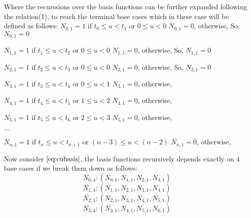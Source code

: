 \documentclass{article}
\begin{document}
Where the recurssions over the basis functions can be further expanded following the relation(1), to reach the terminal base cases which in these case will be defined as follows: \newline
$N_{0,1} = 1 $ if $t_0 \leq u < t_1$ or $0 \leq u < 0$ \newline
$N_{0,1} = 0$, otherwise, \newline
So, $N_{0,1} = 0$ \newline \newline

$N_{1,1} = 1 $ if $t_1 \leq u < t_2$ or $0 \leq u < 0$ \newline
$N_{1,1} = 0$, otherwise, \newline
So, $N_{1,1} = 0$ \newline \newline

$N_{2,1} = 1 $ if $t_2 \leq u < t_3$ or $0 \leq u < 0$ \newline
$N_{2,1} = 0$, otherwise, \newline
So, $N_{2,1} = 0$ \newline \newline

$N_{3,1} = 1$ if $t_3 \leq u < t_4$ or $0 \leq u < 1$ \newline
$N_{3,1} = 0$, otherwise, \newline \newline

$N_{4,1} = 1$ if $t_4 \leq u < t_5$ or $1 \leq u < 2$ \newline
$N_{4,1} = 0$, otherwise, \newline \newline

$N_{5,1} = 1$ if $t_5 \leq u < t_6$ or $2 \leq u < 3$ \newline
$N_{5,1} = 0$, otherwise, \newline 

$\dots$ \newline

$N_{n,1} = 1$ if $t_n \leq u < t_{n+1}$ or $(n-3) \leq u < (n-2)$ \newline
$N_{n,1} = 0$, otherwise, \newline \newline

Now consider $\eqref{eq:cubasis}$, the basis functions recursively depends exactly on 4 base cases if we break them down as follows: \newline
\[ N_{0,4} : (N_{0,1}, N_{1,1}, N_{2,1}, N_{3,1})\]
\[ N_{1,4} : ( N_{1,1}, N_{2,1}, N_{3,1}, N_{4,1})\]
\[ N_{2,4} : ( N_{2,1}, N_{3,1}, N_{4,1}, N_{5,1})\]
\[ N_{3,4} : ( N_{3,1}, N_{4,1}, N_{5,1}, N_{6,1})\]
\end{document}
